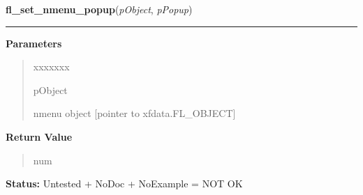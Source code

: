 \hspace{.8\funcindent}\begin{boxedminipage}{\funcwidth}

    \raggedright \textbf{fl\_set\_nmenu\_popup}(\textit{pObject}, \textit{pPopup})

    \vspace{-1.5ex}

    \rule{\textwidth}{0.5\fboxrule}
\setlength{\parskip}{2ex}
\setlength{\parskip}{1ex}
      \textbf{Parameters}
      \vspace{-1ex}

      \begin{quote}
        \begin{Ventry}{xxxxxxx}

          \item[pObject]

          nmenu object [pointer to xfdata.FL\_OBJECT]

        \end{Ventry}

      \end{quote}

      \textbf{Return Value}
    \vspace{-1ex}

      \begin{quote}
      num

      \end{quote}

\textbf{Status:} Untested + NoDoc + NoExample = NOT OK



    \end{boxedminipage}

    \label{xformslib:library:fl_get_nmenu_item}

    \vspace{0.5ex}


